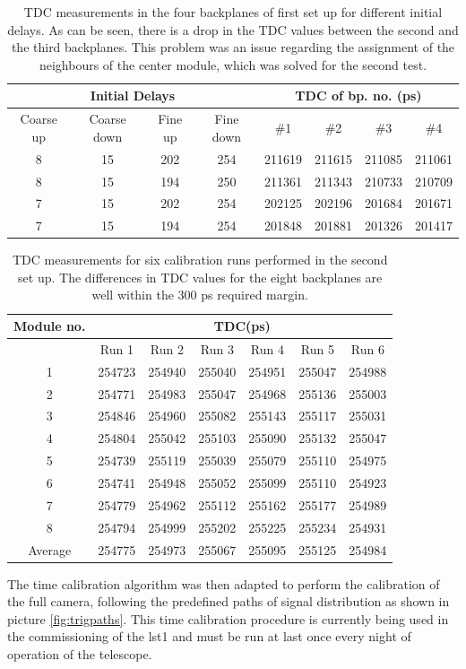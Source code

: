 \documentclass[main.tex]{subfiles}
\begin{document}
\begin{table}
  \centering
  \begin{tabular}{cccccccc}
    \hline
    \multicolumn{4}{c}{Initial Delays} & \multicolumn{4}{c}{TDC of bp. no. (ps)} \\
    \hline
    Coarse up & Coarse down & Fine up & Fine down & \#1 & \#2 & \#3 & \#4 \\
    \hline
    8 & 15 & 202 & 254 & 211619 & 211615 & 211085 & 211061 \\
    8 & 15 & 194 & 250 & 211361 & 211343 & 210733 & 210709 \\
    7 & 15 & 202 & 254 & 202125 & 202196 & 201684 & 201671 \\
    7 & 15 & 194 & 254 & 201848 & 201881 & 201326 & 201417 \\
    \hline
  \end{tabular}
  \caption{TDC measurements in the four backplanes of first set up for different initial delays. As can be seen, there is a drop in the TDC values between the second and the third backplanes. This problem was an issue regarding the assignment of the neighbours of the center module, which was solved for the second test.}
  \label{tab:timecal-test1}
\end{table}

\begin{table}
  \centering
  \begin{tabular}{ccccccc}
    \hline
    \multicolumn{1}{c}{Module no.} & \multicolumn{6}{c}{TDC(ps)} \\
    \hline
     & Run 1 & Run 2 & Run 3 & Run 4 & Run 5 & Run 6 \\
    \hline
    1 & 254723 & 254940 & 255040 & 254951 & 255047 & 254988 \\
    2 & 254771 & 254983 & 255047 & 254968 & 255136 & 255003 \\
    3 & 254846 & 254960 & 255082 & 255143 & 255117 & 255031 \\
    4 & 254804 & 255042 & 255103 & 255090 & 255132 & 255047 \\
    5 & 254739 & 255119 & 255039 & 255079 & 255110 & 254975 \\
    6 & 254741 & 254948 & 255052 & 255099 & 255110 & 254923 \\
    7 & 254779 & 254962 & 255112 & 255162 & 255177 & 254989 \\
    8 & 254794 & 254999 & 255202 & 255225 & 255234 & 254931 \\
    \hline
    Average & 254775 & 254973 & 255067 & 255095 & 255125 & 254984 \\
    \hline
  \end{tabular}
  \caption{TDC measurements for six calibration runs performed in the second set up. The differences in TDC values for the eight backplanes are well within the 300 ps required margin.}
  \label{tab:timecal-test2}
\end{table}

The time calibration algorithm was then adapted to perform the calibration of the full camera, following the predefined paths of signal distribution as shown in picture \ref{fig:trigpaths}. This time calibration procedure is currently being used in the commissioning of the \gls{lst}1 and must be run at last once every night of operation of the telescope.
\end{document}

